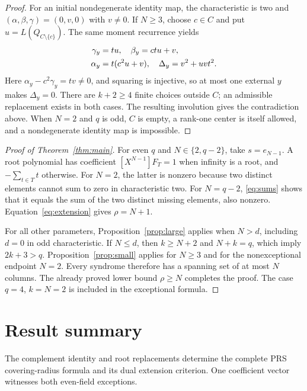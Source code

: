 \documentclass[12pt,letterpaper,onecolumn]{article}
\theoremstyle{definition}
\begin{document}
\begin{proof}
For an initial nondegenerate identity map, the characteristic is two and $(\alpha,\beta,\gamma)=(0,v,0)$ with $v\ne0$. If $N\ge3$, choose $c\in C$ and put $u=L(Q_{C\setminus\{c\}})$. The same moment recurrence yields
\begin{align}
 \gamma_y&=tu,\quad\beta_y=ctu+v,\notag\\
 \alpha_y&=t(c^2u+v),\quad\Delta_y=v^2+uvt^2.\label{eq:idchange}
\end{align}
Here $\alpha_y-c^2\gamma_y=tv\ne0$, and squaring is injective, so at most one external $y$ makes $\Delta_y=0$. There are $k+2\ge4$ finite choices outside $C$; an admissible replacement exists in both cases. The resulting involution gives the contradiction above. When $N=2$ and $q$ is odd, $C$ is empty, a rank-one center is itself allowed, and a nondegenerate identity map is impossible.
\end{proof}

\begin{proof}[Proof of Theorem~\ref{thm:main}]
For even $q$ and $N\in\{2,q-2\}$, take $s=e_{N-1}$. A root polynomial has coefficient $[X^{N-1}]F_T=1$ when infinity is a root, and $-\sum_{t\in T}t$ otherwise. For $N=2$, the latter is nonzero because two distinct elements cannot sum to zero in characteristic two. For $N=q-2$, \eqref{eq:sums} shows that it equals the sum of the two distinct missing elements, also nonzero. Equation~\eqref{eq:extension} gives $\rho=N+1$.

For all other parameters, Proposition~\ref{prop:large} applies when $N>d$, including $d=0$ in odd characteristic. If $N\le d$, then $k\ge N+2$ and $N+k=q$, which imply $2k+3>q$. Proposition~\ref{prop:small} applies for $N\ge3$ and for the nonexceptional endpoint $N=2$. Every syndrome therefore has a spanning set of at most $N$ columns. The already proved lower bound $\rho\ge N$ completes the proof. The case $q=4$, $k=N=2$ is included in the exceptional formula.
\end{proof}

\section{Result summary}
The complement identity and root replacements determine the complete PRS covering-radius formula and its dual extension criterion. One coefficient vector witnesses both even-field exceptions.
\end{document}
